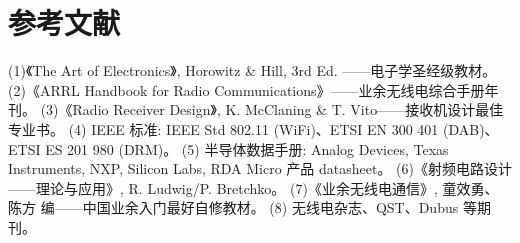 \documentclass[12pt,UTF8]{ctexbook}
\begin{document}
\chapter{参考文献}
(1)《The Art of Electronics》, Horowitz \& Hill, 3rd Ed. ——电子学圣经级教材。
(2)《ARRL Handbook for Radio Communications》——业余无线电综合手册年刊。
(3)《Radio Receiver Design》, K. McClaning \& T. Vito——接收机设计最佳专业书。
(4) IEEE 标准: IEEE Std 802.11 (WiFi)、ETSI EN 300 401 (DAB)、ETSI ES 201 980 (DRM)。
(5) 半导体数据手册: Analog Devices, Texas Instruments, NXP, Silicon Labs, RDA Micro 产品 datasheet。 
(6)《射频电路设计——理论与应用》, R. Ludwig/P. Bretchko。
(7)《业余无线电通信》, 童效勇、陈方 编——中国业余入门最好自修教材。
(8) 无线电杂志、QST、Dubus 等期刊。
\end{document}
